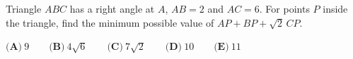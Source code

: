 Triangle $ABC$ has a right angle at $A$, $AB=2$ and $AC=6$. For points $P$ inside the triangle, find the minimum possible value of $AP+BP+\sqrt2\,CP$.

$\textbf{(A)}\ 9\qquad\textbf{(B)}\ 4\sqrt6\qquad\textbf{(C)}\ 7\sqrt2\qquad\textbf{(D)}\ 10\qquad\textbf{(E)}\ 11$
